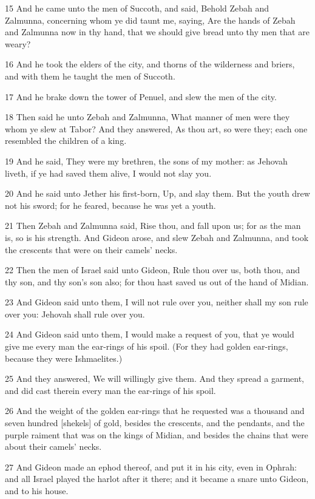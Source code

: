 \par 15 And he came unto the men of Succoth, and said, Behold Zebah and Zalmunna, concerning whom ye did taunt me, saying, Are the hands of Zebah and Zalmunna now in thy hand, that we should give bread unto thy men that are weary?
\par 16 And he took the elders of the city, and thorns of the wilderness and briers, and with them he taught the men of Succoth.
\par 17 And he brake down the tower of Penuel, and slew the men of the city.
\par 18 Then said he unto Zebah and Zalmunna, What manner of men were they whom ye slew at Tabor? And they answered, As thou art, so were they; each one resembled the children of a king.
\par 19 And he said, They were my brethren, the sons of my mother: as Jehovah liveth, if ye had saved them alive, I would not slay you.
\par 20 And he said unto Jether his first-born, Up, and slay them. But the youth drew not his sword; for he feared, because he was yet a youth.
\par 21 Then Zebah and Zalmunna said, Rise thou, and fall upon us; for as the man is, so is his strength. And Gideon arose, and slew Zebah and Zalmunna, and took the crescents that were on their camels' necks.
\par 22 Then the men of Israel said unto Gideon, Rule thou over us, both thou, and thy son, and thy son's son also; for thou hast saved us out of the hand of Midian.
\par 23 And Gideon said unto them, I will not rule over you, neither shall my son rule over you: Jehovah shall rule over you.
\par 24 And Gideon said unto them, I would make a request of you, that ye would give me every man the ear-rings of his spoil. (For they had golden ear-rings, because they were Ishmaelites.)
\par 25 And they answered, We will willingly give them. And they spread a garment, and did cast therein every man the ear-rings of his spoil.
\par 26 And the weight of the golden ear-rings that he requested was a thousand and seven hundred [shekels] of gold, besides the crescents, and the pendants, and the purple raiment that was on the kings of Midian, and besides the chains that were about their camels' necks.
\par 27 And Gideon made an ephod thereof, and put it in his city, even in Ophrah: and all Israel played the harlot after it there; and it became a snare unto Gideon, and to his house.
